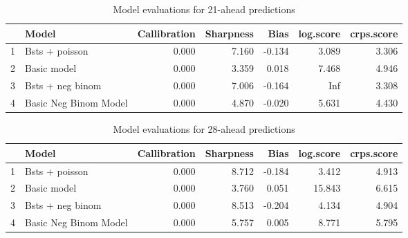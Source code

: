 \begin{table}[ht]
\centering
\begin{tabular}{rlrrrrr}
  \hline
 & Model & Callibration & Sharpness & Bias & log.score & crps.score \\ 
  \hline
1 & Bsts + poisson  & 0.000 & 7.160 & -0.134 & 3.089 & 3.306 \\ 
  2 & Basic model & 0.000 & 3.359 & 0.018 & 7.468 & 4.946 \\ 
  3 & Bsts + neg binom  & 0.000 & 7.006 & -0.164 &  Inf & 3.308 \\ 
  4 & Basic Neg Binom Model & 0.000 & 4.870 & -0.020 & 5.631 & 4.430 \\ 
   \hline
\end{tabular}
\caption{Model evaluations for 21-ahead predictions} 
\label{tab:21_evo}
\end{table}
\begin{table}[ht]
\centering
\begin{tabular}{rlrrrrr}
  \hline
 & Model & Callibration & Sharpness & Bias & log.score & crps.score \\ 
  \hline
1 & Bsts + poisson  & 0.000 & 8.712 & -0.184 & 3.412 & 4.913 \\ 
  2 & Basic model & 0.000 & 3.760 & 0.051 & 15.843 & 6.615 \\ 
  3 & Bsts + neg binom  & 0.000 & 8.513 & -0.204 & 4.134 & 4.904 \\ 
  4 & Basic Neg Binom Model & 0.000 & 5.757 & 0.005 & 8.771 & 5.795 \\ 
   \hline
\end{tabular}
\caption{Model evaluations for 28-ahead predictions} 
\label{tab:28_evo}
\end{table}
